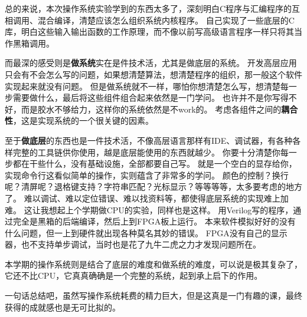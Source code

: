 \documentclass[logo,reportComp]{thesis}
\begin{document}
总的来说，本次操作系统实验学到的东西太多了，深刻明白C程序与汇编程序的互相调用、混合编译，清楚应该怎么组织系统内核程序。
自己实现了一些底层的C库，明白这些输入输出函数的工作原理，而不像以前写高级语言程序一样只将其当作黑箱调用。

而最深的感受则是\textbf{做系统}实在是件技术活，尤其是做底层的系统。
开发高层应用只会有不会怎么写的问题，如果想清楚算法，想清楚程序的组织，那一般这个软件实现起来就没有问题。
但是做系统就不一样，哪怕你想清楚怎么写，想清楚每一步需要做什么，最后将这些组件组合起来依然是一门学问。
也许并不是你写得不好，而是胶水不够给力，这样你的系统依然是不work的。
考虑各组件之间的\textbf{耦合性}，这是实现系统的一个很关键的因素。

至于\textbf{做底层}的东西也是一件技术活，不像高层语言那样有IDE、调试器，有各种各样完整的工具链供你使用，越是底层能使用的东西就越少。
你要十分清楚你每一步都在干些什么，没有基础设施，全部都要自己写。
就是一个空白的显存给你，实现命令行这看似简单的操作，实则蕴含了非常多的学问。
颜色的控制？换行呢？清屏呢？退格键支持？字符串匹配？光标显示？等等等等，太多要考虑的地方了。
难以调试、难以定位错误、难以找资料等，都使得底层系统的实现难上加难。
这让我想起上个学期做CPU的实验，同样也是这样。
用Verilog写的程序，通过完全是黑箱的后端编译，然后上到FPGA板上运行。
本来软件模拟好好的没有什么问题，但一上到硬件就出现各种莫名其妙的错误。
FPGA没有自己的显示器，也不支持单步调试，当时也是花了九牛二虎之力才发现问题所在。

本学期的操作系统则是结合了底层的难度和做系统的难度，可以说是极其复杂了，它还不比CPU，它真真确确是一个完整的系统，起到承上启下的作用。

一句话总结吧，虽然写操作系统耗费的精力巨大，但是这真是一门有趣的课，最终获得的成就感也是无可比拟的。
\end{document}
